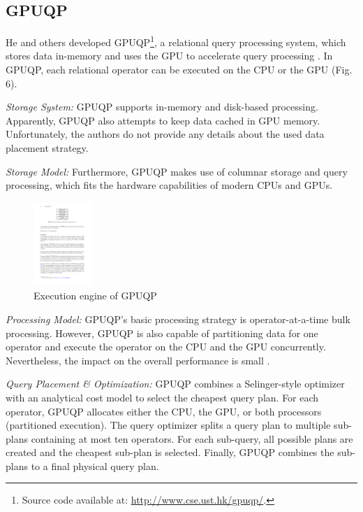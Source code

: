 \documentclass[twocolumn]{article}
\begin{document}
\subsection{GPUQP}
He and others developed GPUQP\footnote{Source code available at: \href{http://www.cse.ust.hk/gpuqp/}{http://www.cse.ust.hk/gpuqp/}.}, a relational query processing system, which stores data in-memory and uses the GPU to accelerate query processing \cite{Fang:2007}. In GPUQP, each relational operator can be executed on the CPU or the GPU (Fig. 6).

\noindent
\textit{Storage System:} 
GPUQP supports in-memory and disk-based processing. 
Apparently, GPUQP also attempts to keep data cached in GPU memory. 
Unfortunately, the authors do not provide any details about the used data placement strategy.

\noindent
\textit{Storage Model:} 
Furthermore, GPUQP makes use of columnar storage and query processing, which fits the hardware capabilities of modern CPUs and GPUs.
\begin{figure}[htb]
        \centering
        \includegraphics[width=0.2\textwidth]{gpuqp.pdf}
        \caption{Execution engine of GPUQP}
        \label{fig:gpudb}
\end{figure}

\noindent
\textit{Processing Model:} 
GPUQP's basic processing strategy is operator-at-a-time bulk processing. 
However, GPUQP is also capable of partitioning data for one operator and execute the operator on the CPU and the GPU concurrently. 
Nevertheless, the impact on the overall performance is small \cite{He:2009}.

\noindent
\textit{Query Placement \& Optimization:} 
GPUQP combines a Selinger-style optimizer \cite{Selinger:1988} with an analytical cost model to select the cheapest query plan. For each operator, GPUQP allocates either the CPU, the GPU, or both processors (partitioned execution). The query optimizer splits a query plan to multiple sub-plans containing at most ten operators. For each sub-query, all possible plans are created and the cheapest sub-plan is selected. Finally, GPUQP combines the sub-plans to a final physical query plan.
\end{document}
